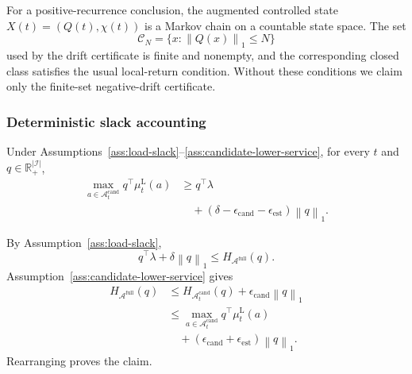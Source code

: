 \documentclass[opre,dblanonrev]{informs4}
\newcommand{\Afull}{\mathcal A^{\mathrm{full}}}
\newcommand{\Acand}{\mathcal A^{\mathrm{cand}}}
\newcommand{\Real}{\mathbb R}
\newcommand{\lowermu}{\mu^{\mathrm L}}
\newcommand{\normone}[1]{\left\|#1\right\|_1}
\begin{document}
\begin{assumption}
\label{ass:foster-state}
For a positive-recurrence conclusion, the augmented controlled state
\(X(t)=(Q(t),\chi(t))\) is a Markov chain on a countable state space.  The set
\begin{equation}
  \mathcal C_N
  =\{x:\normone{Q(x)}\le N\}
\end{equation}
used by the drift certificate is finite and nonempty, and the corresponding
closed class satisfies the usual local-return condition.  Without these
conditions we claim only the finite-set negative-drift certificate.
\end{assumption}

\subsubsection{Deterministic slack accounting}
\label{subsubsec:deterministic-slack}

\begin{lemma}
\label{lem:support-after-losses}
Under Assumptions~\ref{ass:load-slack}--\ref{ass:candidate-lower-service}, for
every \(t\) and \(q\in\Real_+^{|\mathcal I|}\),
\begin{equation}
  \begin{aligned}
  \max_{a\in\Acand_t} q^\top\lowermu_t(a)
  &\ge q^\top\lambda\\
  &\quad{}
  +(\delta-\epsilon_{\mathrm{cand}}
  -\epsilon_{\mathrm{est}})\normone{q}.
  \end{aligned}
\end{equation}
\end{lemma}

By Assumption~\ref{ass:load-slack},
\begin{equation}
q^\top\lambda+\delta\normone{q}\le H_{\Afull}(q).
\end{equation}
Assumption~\ref{ass:candidate-lower-service} gives
\begin{equation}
  \begin{aligned}
  H_{\Afull}(q)
  &\le H_{\Acand_t}(q)
      +\epsilon_{\mathrm{cand}}\normone{q}\\
  &\le
  \max_{a\in\Acand_t}q^\top\lowermu_t(a)\\
  &\quad{}+
  (\epsilon_{\mathrm{cand}}+\epsilon_{\mathrm{est}})\normone{q}.
  \end{aligned}
\end{equation}
Rearranging proves the claim.
\endproof
\end{document}
